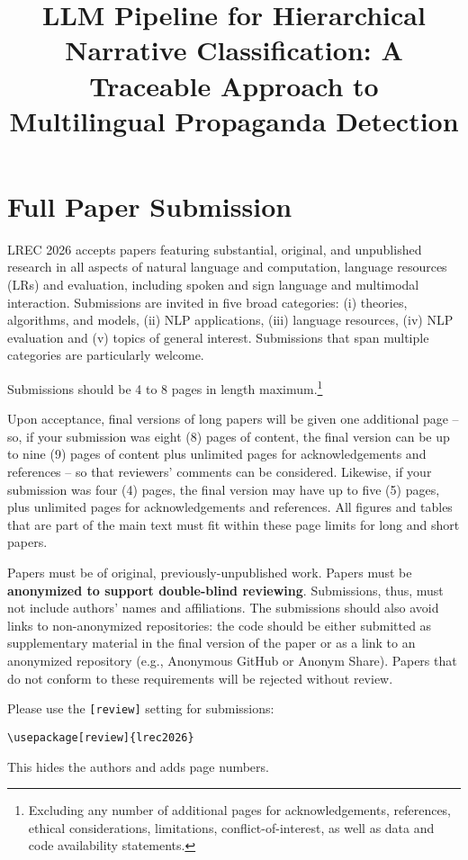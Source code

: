 \documentclass[10pt, a4paper]{article}
\title{LLM Pipeline for Hierarchical Narrative Classification: A Traceable Approach to Multilingual Propaganda Detection}
\begin{document}
\maketitleabstract

\section{Full Paper Submission}

LREC 2026 accepts papers featuring substantial, original, and unpublished research in all aspects of natural language and computation, language resources (LRs) and evaluation, including spoken and sign language and multimodal interaction. Submissions are invited in five broad categories: (i) theories, algorithms, and models, (ii) NLP applications, (iii) language resources, (iv) NLP evaluation and (v) topics of general interest. Submissions that span multiple categories are particularly welcome.   

Submissions should be 4 to 8 pages in length maximum.\footnote{Excluding any number of additional pages for acknowledgements, references, ethical considerations, limitations, conflict-of-interest, as well as data and code availability statements.}

Upon acceptance, final versions of long papers will be given one
additional page – so, if your submission was eight (8) pages of content, the final version can be up to nine (9) pages of content plus unlimited pages for acknowledgements and references – so that reviewers’ comments can be considered. Likewise, if your submission was four (4) pages, the final version may have up to five (5) pages, plus unlimited pages for acknowledgements and references. All figures and tables that are part of the main text must fit within these page limits for long and short papers.

Papers must be of original, previously-unpublished work. Papers must be \textbf{anonymized to support double-blind reviewing}. Submissions, thus, must not include authors’ names and affiliations. The submissions should also avoid links to non-anonymized repositories: the code should be either submitted as supplementary material in the final version of the paper or as a link to an anonymized repository (e.g., Anonymous GitHub or Anonym Share). Papers that do not conform to these requirements will be rejected without review.

Please use the \texttt{[review]} setting for submissions:

\begin{verbatim}
\usepackage[review]{lrec2026}
\end{verbatim}

This hides the authors and adds page numbers.
\end{document}
